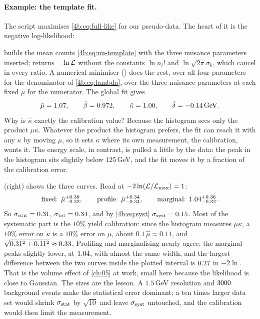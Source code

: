 \paragraph{Example: the template fit.}
The script  maximises \eqref{4b:eq:full-like}
for our pseudo-data. The heart of it is the negative log-likelihood:


 builds the mean counts \eqref{4b:eq:nu-template} with the three
nuisance parameters inserted;  returns $-\ln\mathcal{L}$ without the constants
$\ln n_i!$ and $\ln\sqrt{2\pi}\sigma_k$, which cancel in every ratio. A numerical
minimiser () does the rest, over all four parameters
for the denominator of \eqref{4b:eq:lambda}, over the three nuisance parameters at
each fixed $\mu$ for the numerator. The global fit gives
\[
  \hat\mu=1.07,\qquad
  \hat\beta=0.972,\qquad
  \hat\kappa=1.00,\qquad
  \hat\delta=-0.14\,\text{GeV}.
\]
Why is $\hat\kappa$ exactly the calibration value? Because the histogram sees only the
product $\mu\kappa$. Whatever the product the histogram prefers, the fit can reach it
with any $\kappa$ by moving $\mu$, so it sets $\kappa$ where its own measurement, the
calibration, wants it. The energy scale, in contrast, is pulled a little by the data:
the peak in the histogram sits slightly below $125\,$GeV, and the fit moves it by a
fraction of the calibration error.

 (right) shows the three curves. Read at
$-2\ln(\mathcal{L}/\mathcal{L}_{\max})=1$:
\[
  \text{fixed: }\hat\mu^{+0.30}_{-0.32},
  \qquad
  \text{profile: }\hat\mu^{+0.34}_{-0.34},
  \qquad
  \text{marginal: }1.04^{+0.36}_{-0.32}.
\]
So $\sigma_{\rm stat}=0.31$, $\sigma_{\rm tot}=0.34$, and by
\eqref{4b:eq:syst} $\sigma_{\rm syst}=0.15$. Most of the systematic part is the
$10\%$ yield calibration: since the histogram measures $\mu\kappa$, a $10\%$ error on
$\kappa$ is a $10\%$ error on $\mu$, about $0.1\,\hat\mu\approx0.11$, and
$\sqrt{0.31^2+0.11^2}\approx0.33$. Profiling and marginalising nearly agree: the marginal peaks slightly lower, at
$1.04$, with almost the same width, and the largest difference between the two curves inside the
plotted interval is $0.27$ in $-2\ln$. That is the volume effect of
\cref{ch:05} at work, small here because the likelihood is close to Gaussian. The
sizes are the lesson. A $1.5\,$GeV resolution and $3000$ background events make
the statistical error dominant; a ten times larger data set would shrink
$\sigma_{\rm stat}$ by $\sqrt{10}$ and leave $\sigma_{\rm syst}$ untouched, and the
calibration would then limit the measurement.

